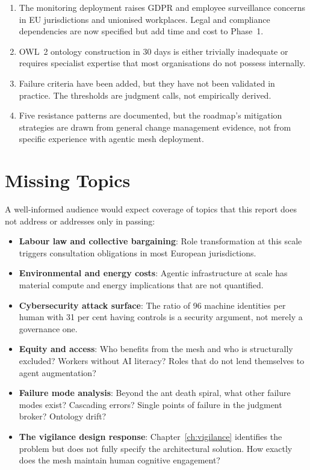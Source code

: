 \begin{enumerate}
  \item The monitoring deployment raises GDPR and employee surveillance concerns in EU jurisdictions and unionised workplaces. Legal and compliance dependencies are now specified but add time and cost to Phase~1.
  \item OWL~2 ontology construction in 30 days is either trivially inadequate or requires specialist expertise that most organisations do not possess internally.
  \item Failure criteria have been added, but they have not been validated in practice. The thresholds are judgment calls, not empirically derived.
  \item Five resistance patterns are documented, but the roadmap's mitigation strategies are drawn from general change management evidence, not from specific experience with agentic mesh deployment.
\end{enumerate}

\section{Missing Topics}

A well-informed audience would expect coverage of topics that this report does not address or addresses only in passing:

\begin{itemize}
  \item \textbf{Labour law and collective bargaining}: Role transformation at this scale triggers consultation obligations in most European jurisdictions.
  \item \textbf{Environmental and energy costs}: Agentic infrastructure at scale has material compute and energy implications that are not quantified.
  \item \textbf{Cybersecurity attack surface}: The ratio of 96 machine identities per human with 31 per cent having controls is a security argument, not merely a governance one.
  \item \textbf{Equity and access}: Who benefits from the mesh and who is structurally excluded? Workers without AI literacy? Roles that do not lend themselves to agent augmentation?
  \item \textbf{Failure mode analysis}: Beyond the ant death spiral, what other failure modes exist? Cascading errors? Single points of failure in the judgment broker? Ontology drift?
  \item \textbf{The vigilance design response}: Chapter~\ref{ch:vigilance} identifies the problem but does not fully specify the architectural solution. How exactly does the mesh maintain human cognitive engagement?
\end{itemize}

